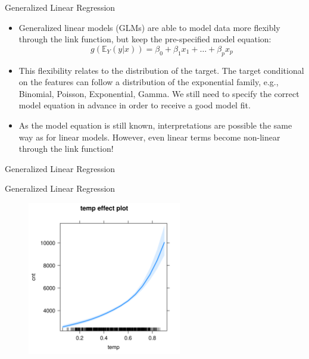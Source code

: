 \documentclass[11pt,compress,t,notes=noshow, xcolor=table]{beamer}
\begin{document}
\begin{vbframe}{Generalized Linear Regression}

\begin{itemize}
\item Generalized linear models (GLMs) are able to model data more flexibly through the link function, but keep the pre-specified model equation: 
$$
g\left(\mathbb{E}_Y(y \vert x)\right) = \beta_0 + \beta_1 x_1 + \dots + \beta_p x_p
$$
\item This flexibility relates to the distribution of the target. The target conditional on the features can follow a distribution of the exponential family, e.g., Binomial, Poisson, Exponential, Gamma. We still need to specify the correct model equation in advance in order to receive a good model fit.
\item As the model equation is still known, interpretations are possible the same way as for linear models. However, even linear terms become non-linear through the link function!
\end{itemize}
\end{vbframe}


\begin{vbframe}{Generalized Linear Regression}
\tiny

\end{vbframe}

\begin{vbframe}{Generalized Linear Regression}
\begin{figure}
  \includegraphics[width = 0.6\textwidth]{figure/glm_effect_plot.png}
\end{figure}
\end{vbframe}
\end{document}
